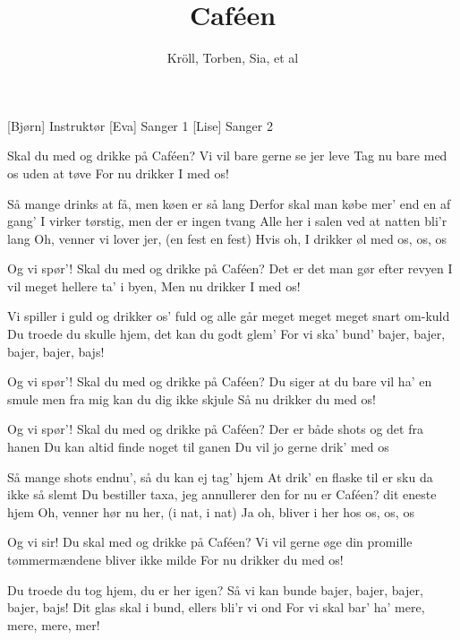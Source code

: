 \documentclass[a4paper,11pt]{article}
\title{Caféen}
\author{Kröll, Torben, Sia, et al}
\begin{document}
\maketitle


\begin{roles}
[Bjørn] Instruktør
 [Eva] Sanger 1
 [Lise] Sanger 2
\end{roles}

\begin{song}


 Skal du med og drikke på Caféen?
Vi vil bare gerne se jer leve
Tag nu bare med os uden at tøve
For nu drikker I med os!

 Så mange drinks at få, men køen er så lang 
Derfor skal man købe mer' end en af gang'
I virker tørstig, men der er ingen tvang
Alle her i salen ved at natten bli'r lang
 Oh, 
 venner vi lover jer, 
(en fest en fest)
 Hvis oh, I drikker øl med os, os, os 

 Og vi spør’!
Skal du med og drikke på Caféen?
 Det er det man gør efter revyen
I vil meget hellere ta' i byen,
 Men nu drikker I med os!

Vi spiller i guld
og drikker os' fuld
og alle går meget meget meget snart om-kuld
 Du troede du skulle hjem, 
 det kan du godt glem'
 For vi ska’ bund’ bajer, bajer, bajer, bajer, bajs!

Og vi spør’!
Skal du med og drikke på Caféen?
 Du siger at du bare vil ha' en smule
men fra mig kan du dig ikke skjule
 Så nu drikker du med os!

Og vi spør’!
Skal du med og drikke på Caféen?
 Der er både shots og det fra hanen
Du kan altid finde noget til ganen
 Du vil jo gerne drik’ med os

 Så mange shots endnu’, så du kan ej tag' hjem
At drik’ en flaske til er sku da ikke så slemt
 Du bestiller taxa, jeg annullerer den 
for nu er Caféen? dit eneste hjem
 Oh, 
 venner hør nu her, 
 (i nat, i nat)
 Ja oh, bliver i her hos os, os, os

Og vi sir!
Du skal med og drikke på Caféen?
 Vi vil gerne øge din promille
tømmermændene bliver ikke milde
 For nu drikker du med os!

Du troede du tog hjem,
du er her igen?
Så vi kan bunde bajer, bajer, bajer, bajer, bajs!
 Dit glas skal i bund,
 ellers bli'r vi ond
 For vi skal bar’ ha’ mere, mere, mere, mer!


\end{song}
\end{document}
